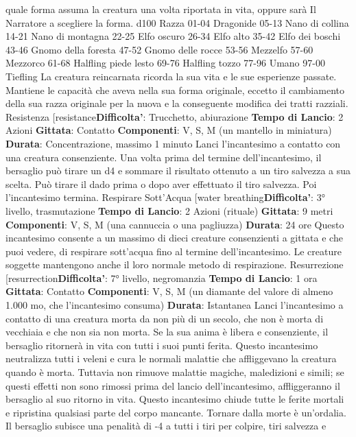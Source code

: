 \begin{multicols}{2}
quale forma assuma la creatura una volta riportata in
vita, oppure sarà Il Narratore a scegliere la forma.
d100 Razza
01-04 Dragonide
05-13 Nano di collina
14-21 Nano di montagna
22-25 Elfo oscuro
26-34 Elfo alto
35-42 Elfo dei boschi
43-46 Gnomo della foresta
47-52 Gnomo delle rocce
53-56 Mezzelfo
57-60 Mezzorco
61-68 Halfling piede lesto
69-76 Halfling tozzo
77-96 Umano
97-00 Tiefling
La creatura reincarnata ricorda la sua vita e le sue
esperienze passate. Mantiene le capacità che aveva
nella sua forma originale, eccetto il cambiamento della
sua razza originale per la nuova e la conseguente
modifica dei tratti razziali.
Resistenza
[resistance\textbf{Difficolta'}:
Trucchetto, abiurazione
\textbf{Tempo di Lancio}: 2 Azioni
\textbf{Gittata}: Contatto
\textbf{Componenti}: V, S, M (un mantello in miniatura)
\textbf{Durata}: Concentrazione, massimo 1 minuto
Lanci l’incantesimo a contatto con una creatura
consenziente. Una volta prima del termine
dell’incantesimo, il bersaglio può tirare un d4 e
sommare il risultato ottenuto a un tiro salvezza a sua
scelta. Può tirare il dado prima o dopo aver effettuato il
tiro salvezza. Poi l’incantesimo termina.
Respirare Sott’Acqua
[water breathing\textbf{Difficolta'}:
3° livello, trasmutazione
\textbf{Tempo di Lancio}: 2 Azioni (rituale)
\textbf{Gittata}: 9 metri
\textbf{Componenti}: V, S, M (una cannuccia o una pagliuzza)
\textbf{Durata}: 24 ore
Questo incantesimo consente a un massimo di dieci
creature consenzienti a gittata e che puoi vedere, di
respirare sott’acqua fino al termine dell’incantesimo. Le
creature soggette mantengono anche il loro normale
metodo di respirazione.
Resurrezione
[resurrection\textbf{Difficolta'}:
7° livello, negromanzia
\textbf{Tempo di Lancio}: 1 ora
\textbf{Gittata}: Contatto
\textbf{Componenti}: V, S, M (un diamante del valore di
almeno 1.000 mo, che l’incantesimo consuma)
\textbf{Durata}: Istantanea
Lanci l’incantesimo a contatto di una creatura morta da
non più di un secolo, che non è morta di vecchiaia e
che non sia non morta. Se la sua anima è libera e
consenziente, il bersaglio ritornerà in vita con tutti i suoi
punti ferita.
Questo incantesimo neutralizza tutti i veleni e cura le
normali malattie che affliggevano la creatura quando è
morta. Tuttavia non rimuove malattie magiche,
maledizioni e simili; se questi effetti non sono rimossi
prima del lancio dell’incantesimo, affliggeranno il
bersaglio al suo ritorno in vita.
Questo incantesimo chiude tutte le ferite mortali e
ripristina qualsiasi parte del corpo mancante.
Tornare dalla morte è un’ordalia. Il bersaglio subisce
una penalità di -4 a tutti i tiri per colpire, tiri salvezza e

\end{multicols}
